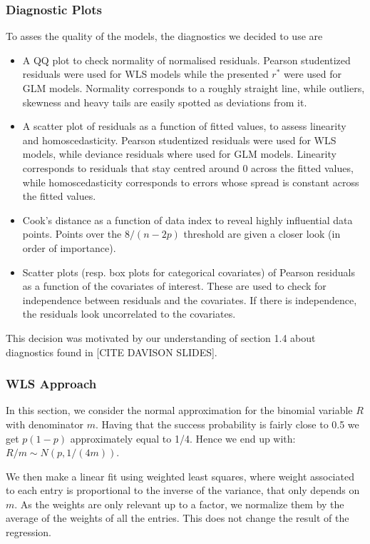 \documentclass[a4paper, 12pt,oneside]{article}
\begin{document}
			\subsubsection{Diagnostic Plots}
				To asses the quality of the models, the diagnostics we decided to use are 
				\begin{itemize}
					\item A QQ plot to check normality of normalised residuals. Pearson studentized residuals were used for WLS models while the presented $r^*$ were used for GLM models. Normality corresponds to a roughly straight line, while outliers, skewness and heavy tails are easily spotted as deviations from it.
					\item A scatter plot of residuals as a function of fitted values, to assess linearity and homoscedasticity. Pearson studentized residuals were used for WLS models, while deviance residuals where used for GLM models. Linearity corresponds to residuals that stay centred around 0 across the fitted values, while homoscedasticity corresponds to errors whose spread is constant across the fitted values.
					\item Cook's distance as a function of data index to reveal highly influential data points. Points over the $8/(n-2p)$ threshold are given a closer look (in order of importance). 
					\item Scatter plots (resp. box plots for categorical covariates) of Pearson residuals as a function of the covariates of interest. These are used to check for independence between residuals and the covariates. If there is independence, the residuals look uncorrelated to the covariates. 
				\end{itemize}
				This decision was motivated by our understanding of section 1.4 about diagnostics found in [CITE DAVISON SLIDES]. 
			\subsubsection{WLS Approach}
			In this section, we consider the normal approximation for the binomial variable $R$ with denominator $m$. Having that the success probability is fairly close to 0.5 we get $p(1-p)$ approximately equal to 1/4. Hence we end up with: $R/m \sim N(p,1/(4m))$. 

			We then make a linear fit using weighted least squares, where  weight associated to each entry is proportional to the inverse of the variance, that only depends on $m$. As the weights are only relevant up to a factor,  we normalize them by the average of the weights of all the entries. This does not change the result of the regression. 
\end{document}
